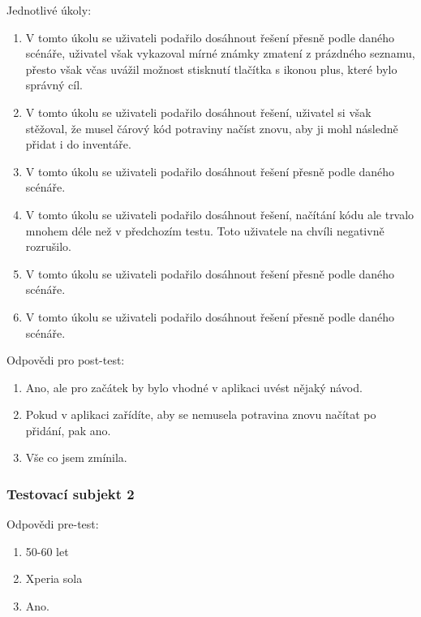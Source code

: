 \documentclass[thesis=B,czech]{FITthesis}[2013/10/20]
\begin{document}
Jednotlivé úkoly:
\begin{enumerate}
  \item V tomto úkolu se uživateli podařilo dosáhnout řešení přesně podle daného scénáře, uživatel však vykazoval mírné známky zmatení z prázdného seznamu, přesto však včas uvážil možnost stisknutí tlačítka s ikonou plus, které bylo správný cíl.
  \item V tomto úkolu se uživateli podařilo dosáhnout řešení, uživatel si však stěžoval, že musel čárový kód potraviny načíst znovu, aby ji mohl následně přidat i do inventáře.
  \item V tomto úkolu se uživateli podařilo dosáhnout řešení přesně podle daného scénáře.
  \item V tomto úkolu se uživateli podařilo dosáhnout řešení, načítání kódu ale trvalo mnohem déle než v předchozím testu. Toto uživatele na chvíli negativně rozrušilo.
  \item V tomto úkolu se uživateli podařilo dosáhnout řešení přesně podle daného scénáře.
  \item V tomto úkolu se uživateli podařilo dosáhnout řešení přesně podle daného scénáře.
\end{enumerate}

Odpovědi pro post-test:
\begin{enumerate}
  \item Ano, ale pro začátek by bylo vhodné v aplikaci uvést nějaký návod.
  \item Pokud v aplikaci zařídíte, aby se nemusela potravina znovu načítat po přidání, pak ano.
  \item Vše co jsem zmínila.
\end{enumerate}

\subsubsection{Testovací subjekt 2}

Odpovědi pre-test:

\begin{enumerate}
  \item 50-60 let
  \item Xperia sola
  \item Ano.
\end{enumerate}
\end{document}
